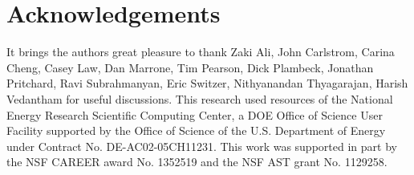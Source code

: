 \documentclass[twocolumn,apj,numberedappendix]{emulateapj}
\newcommand{\N}{\mathbf{N}}
\newcommand{\mep}[1]{{\color{applegreen} \textbf{[MEP:  #1]}}}
\begin{document}
%

\section{Acknowledgements}
It brings the authors great pleasure to thank Zaki Ali, John Carlstrom, Carina Cheng, Casey Law, Dan Marrone, Tim Pearson, Dick Plambeck, Jonathan Pritchard, Ravi Subrahmanyan, Eric Switzer, Nithyanandan Thyagarajan, Harish Vedantham for useful discussions. This research used resources of the National Energy Research
Scientific Computing Center, a DOE Office of Science User Facility 
supported by the Office of Science of the U.S. Department of Energy 
under Contract No. DE-AC02-05CH11231. This work was supported in part by the NSF CAREER award No. 1352519 and the NSF AST grant No. 1129258.
\end{document}
